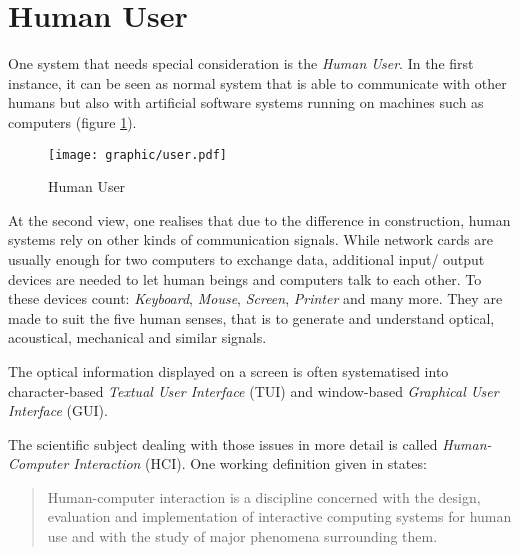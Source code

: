 %
%
%
%
%
%
%

\section{Human User}
\label{human_user_heading}

One system that needs special consideration is the \emph{Human User}. In the
first instance, it can be seen as normal system that is able to communicate
with other humans but also with artificial software systems running on machines
such as computers (figure \ref{user_figure}).

\begin{figure}[ht]
    \begin{center}
        \texttt{[image: graphic/user.pdf]}
        \caption{Human User}
        \label{user_figure}
    \end{center}
\end{figure}

At the second view, one realises that due to the difference in construction,
human systems rely on other kinds of communication signals. While network cards
are usually enough for two computers to exchange data, additional input/ output
devices are needed to let human beings and computers talk to each other. To these
devices count: \emph{Keyboard}, \emph{Mouse}, \emph{Screen}, \emph{Printer} and
many more. They are made to suit the five human senses, that is to generate and
understand optical, acoustical, mechanical and similar signals.

The optical information displayed on a screen is often systematised into
character-based \emph{Textual User Interface} (TUI) and window-based
\emph{Graphical User Interface} (GUI).

The scientific subject dealing with those issues in more detail is called
\emph{Human-Computer Interaction} (HCI). One working definition given in
\cite{sigchi} states:

\begin{quote}
    Human-computer interaction is a discipline concerned with the design,
    evaluation and implementation of interactive computing systems for human
    use and with the study of major phenomena surrounding them.
\end{quote}

